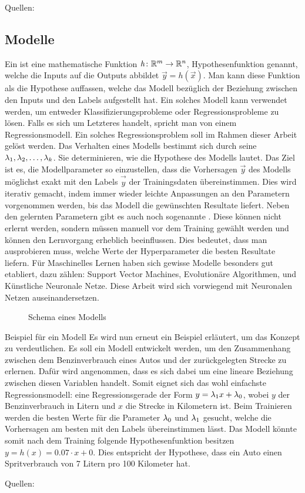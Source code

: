 \para{}
Quellen: \cite{Nielsen} \cite{book:hands-on}

\subsection{Modelle}
Ein  ist eine mathematische Funktion $\mathit{h}\colon \mathbb{R}^m
\to \mathbb{R}^n$, Hypothesenfunktion genannt, welche die Inputs auf die Outputs abbildet $\vec{y}=\mathit{h}(\vec{x})$.
Man kann diese Funktion als die Hypothese auffassen, welche das Modell bezüglich der Beziehung zwischen
den Inputs und den Labels aufgestellt hat.
Ein solches Modell kann verwendet werden, um entweder
Klassifizierungsprobleme oder Regressionsprobleme zu lösen. Falls es sich um
Letzteres handelt, spricht man von einem Regressionsmodell. Ein solches
Regressionsproblem soll im Rahmen dieser Arbeit gelöst werden.
\para{}
Das Verhalten eines Modells bestimmt sich durch seine 
$\lambda_1, \lambda_2,\ldots,\lambda_k$. Sie determinieren, wie die Hypothese des Modells lautet.
Das Ziel ist es, die Modellparameter so einzustellen, dass die Vorhersagen
$\vec{y}$ des Modells möglichst exakt mit den Labels $\vec{\hat{y}}$ der Trainingsdaten übereinstimmen.
Dies wird iterativ gemacht, indem immer wieder leichte Anpassungen an den
Parametern vorgenommen werden, bis das Modell die gewünschten Resultate liefert.
\para{}
Neben den gelernten Parametern gibt es auch noch sogenannte .
Diese können nicht erlernt werden, sondern müssen manuell vor dem Training gewählt werden und können den Lernvorgang erheblich beeinflussen.
Dies bedeutet, dass man ausprobieren muss, welche Werte der Hyperparameter
die besten Resultate liefern.
\para{}
Für Maschinelles Lernen haben sich gewisse Modelle besonders gut etabliert,
dazu zählen: Support Vector Machines, Evolutionäre Algorithmen, und Künstliche Neuronale Netze.
Diese Arbeit wird sich vorwiegend mit Neuronalen Netzen auseinandersetzen.
\para{}
\begin{figure}[h!]
  \centering

  \caption{Schema eines Modells}
\end{figure}
\para{}
\begin{examplebox}{Beispiel für ein Modell}
Es wird nun erneut ein Beispiel erläutert, um das Konzept zu verdeutlichen.
Es soll ein Modell entwickelt werden, um den Zusammenhang zwischen dem
Benzinverbrauch eines Autos und der zurückgelegten Strecke zu erlernen.
Dafür wird angenommen, dass es sich dabei um eine lineare Beziehung zwischen
diesen Variablen handelt. Somit eignet sich das wohl einfachste
Regressionsmodell: eine Regressionsgerade der Form $y=\lambda_1x + \lambda_0$, wobei
$y$ der Benzinverbrauch in Litern und $x$ die Strecke in Kilometern ist.
Beim Trainieren werden die besten Werte für die Parameter $\lambda_0$ und
$\lambda_1$ gesucht, welche die Vorhersagen am besten mit den Labels
übereinstimmen lässt. Das Modell könnte somit nach dem Training folgende
Hypothesenfunktion besitzen $y = h(x) = 0.07 \cdot x + 0$. Dies entspricht der
Hypothese, dass ein Auto einen Spritverbrauch von 7 Litern pro 100 Kilometer hat.
\end{examplebox}
\para{}
Quellen: \cite{book:hands-on}

